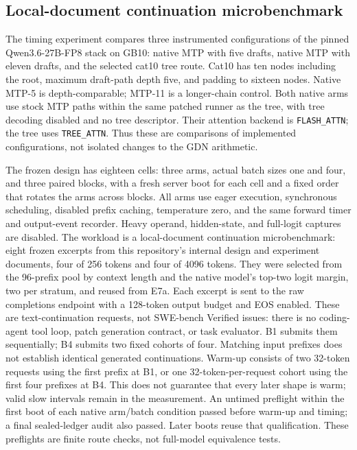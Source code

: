\subsection{Local-document continuation microbenchmark}
\label{sec:e1-timing}
The timing experiment compares three instrumented configurations of the pinned Qwen3.6-27B-FP8 stack on GB10: native MTP with five drafts, native MTP with eleven drafts, and the selected cat10 tree route. Cat10 has ten nodes including the root, maximum draft-path depth five, and padding to sixteen nodes. Native MTP-5 is depth-comparable; MTP-11 is a longer-chain control. Both native arms use stock MTP paths within the same patched runner as the tree, with tree decoding disabled and no tree descriptor. Their attention backend is \texttt{FLASH\_ATTN}; the tree uses \texttt{TREE\_ATTN}. Thus these are comparisons of implemented configurations, not isolated changes to the GDN arithmetic.

The frozen design has eighteen cells: three arms, actual batch sizes one and four, and three paired blocks, with a fresh server boot for each cell and a fixed order that rotates the arms across blocks. All arms use eager execution, synchronous scheduling, disabled prefix caching, temperature zero, and the same forward timer and output-event recorder. Heavy operand, hidden-state, and full-logit captures are disabled. The workload is a local-document continuation microbenchmark: eight frozen excerpts from this repository's internal design and experiment documents, four of 256 tokens and four of 4096 tokens. They were selected from the 96-prefix pool by context length and the native model's top-two logit margin, two per stratum, and reused from E7a. Each excerpt is sent to the raw completions endpoint with a 128-token output budget and EOS enabled. These are text-continuation requests, not SWE-bench Verified issues: there is no coding-agent tool loop, patch generation contract, or task evaluator. B1 submits them sequentially; B4 submits two fixed cohorts of four. Matching input prefixes does not establish identical generated continuations. Warm-up consists of two 32-token requests using the first prefix at B1, or one 32-token-per-request cohort using the first four prefixes at B4. This does not guarantee that every later shape is warm; valid slow intervals remain in the measurement. An untimed preflight within the first boot of each native arm/batch condition passed before warm-up and timing; a final sealed-ledger audit also passed. Later boots reuse that qualification. These preflights are finite route checks, not full-model equivalence tests.

